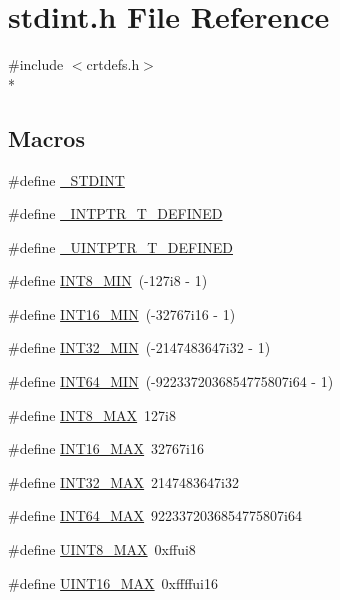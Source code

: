 \section{stdint.\-h File Reference}
\label{stdint_8h}
{\ttfamily \#include $<$crtdefs.\-h$>$}\\*
\subsection*{Macros}
\begin{DoxyCompactItemize}
\item 
\#define \hyperlink{stdint_8h_a42d95d7159ac8a86facb6c7781ccc982}{\-\_\-\-S\-T\-D\-I\-N\-T}
\item 
\#define \hyperlink{stdint_8h_a3ce96ec9d1fcd8dfccadb47145718f9d}{\-\_\-\-I\-N\-T\-P\-T\-R\-\_\-\-T\-\_\-\-D\-E\-F\-I\-N\-E\-D}
\item 
\#define \hyperlink{stdint_8h_a106239fcf6108905a1beb6837f7343c8}{\-\_\-\-U\-I\-N\-T\-P\-T\-R\-\_\-\-T\-\_\-\-D\-E\-F\-I\-N\-E\-D}
\item 
\#define \hyperlink{stdint_8h_aadcf2a81af243df333b31efa6461ab8e}{I\-N\-T8\-\_\-\-M\-I\-N}~(-\/127i8 -\/ 1)
\item 
\#define \hyperlink{stdint_8h_ad4e9955955b27624963643eac448118a}{I\-N\-T16\-\_\-\-M\-I\-N}~(-\/32767i16 -\/ 1)
\item 
\#define \hyperlink{stdint_8h_a688eb21a22db27c2b2bd5836943cdcbe}{I\-N\-T32\-\_\-\-M\-I\-N}~(-\/2147483647i32 -\/ 1)
\item 
\#define \hyperlink{stdint_8h_ab21f12f372f67b8ff0aa3432336ede67}{I\-N\-T64\-\_\-\-M\-I\-N}~(-\/9223372036854775807i64 -\/ 1)
\item 
\#define \hyperlink{stdint_8h_aaf7f29f45f1a513b4748a4e5014ddf6a}{I\-N\-T8\-\_\-\-M\-A\-X}~127i8
\item 
\#define \hyperlink{stdint_8h_ac58f2c111cc9989c86db2a7dc4fd84ca}{I\-N\-T16\-\_\-\-M\-A\-X}~32767i16
\item 
\#define \hyperlink{stdint_8h_a181807730d4a375f848ba139813ce04f}{I\-N\-T32\-\_\-\-M\-A\-X}~2147483647i32
\item 
\#define \hyperlink{stdint_8h_ad0d744f05898e32d01f73f8af3cd2071}{I\-N\-T64\-\_\-\-M\-A\-X}~9223372036854775807i64
\item 
\#define \hyperlink{stdint_8h_aeb4e270a084ee26fe73e799861bd0252}{U\-I\-N\-T8\-\_\-\-M\-A\-X}~0xffui8
\item 
\#define \hyperlink{stdint_8h_a3ea490c9b3617d4479bd80ef93cd5602}{U\-I\-N\-T16\-\_\-\-M\-A\-X}~0xffffui16

\end{DoxyCompactItemize}
